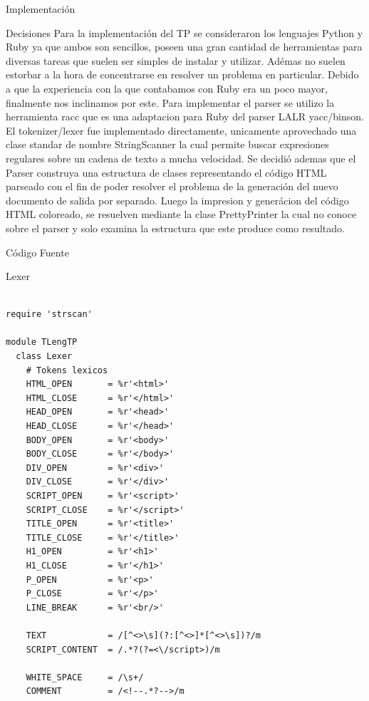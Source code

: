 \documentclass[a4paper,8pt]{article}
\begin{document}
\begin{section}{Implementación}
\begin{subsection}{Decisiones}
Para la implementación del TP se consideraron los lenguajes Python y Ruby ya que ambos son sencillos, poseen una gran cantidad de herramientas para diversas tareas que suelen ser simples de instalar y utilizar. Adémas no suelen estorbar a la hora de concentrarse en resolver un problema en particular. Debido a que la experiencia con la que contabamos con Ruby era un poco mayor, finalmente nos inclinamos por este.
Para implementar el parser se utilizo la herramienta racc que es una adaptacion para Ruby del parser LALR yacc/binson. El tokenizer/lexer fue implementado directamente, unicamente aprovechado una clase standar de nombre StringScanner la cual permite buscar expresiones regulares sobre un cadena de texto a mucha velocidad.
Se decidió ademas que el Parser construya una estructura de clases representando el código HTML parseado con el fin de poder resolver el problema de la generación del nuevo documento de salida por separado. 
Luego la impresion y generácion del código HTML coloreado, se resuelven mediante la clase PrettyPrinter la cual no conoce sobre el parser y solo examina la estructura que este produce como resultado.

\end{subsection}
\bigskip


\begin{subsection}{Código Fuente}

\begin{subsubsection}{Lexer}
\begin{verbatim}

require 'strscan'

module TLengTP
  class Lexer
    # Tokens lexicos
    HTML_OPEN       = %r'<html>'
    HTML_CLOSE      = %r'</html>'
    HEAD_OPEN       = %r'<head>'
    HEAD_CLOSE      = %r'</head>'
    BODY_OPEN       = %r'<body>'
    BODY_CLOSE      = %r'</body>'
    DIV_OPEN        = %r'<div>'
    DIV_CLOSE       = %r'</div>'
    SCRIPT_OPEN     = %r'<script>'
    SCRIPT_CLOSE    = %r'</script>'
    TITLE_OPEN      = %r'<title>'
    TITLE_CLOSE     = %r'</title>'
    H1_OPEN         = %r'<h1>'
    H1_CLOSE        = %r'</h1>'
    P_OPEN          = %r'<p>'
    P_CLOSE         = %r'</p>'
    LINE_BREAK      = %r'<br/>'

    TEXT            = /[^<>\s](?:[^<>]*[^<>\s])?/m
    SCRIPT_CONTENT  = /.*?(?=<\/script>)/m

    WHITE_SPACE     = /\s+/
    COMMENT         = /<!--.*?-->/m


\end{verbatim}
\end{subsubsection}
\end{subsection}
\end{section}
\end{document}
